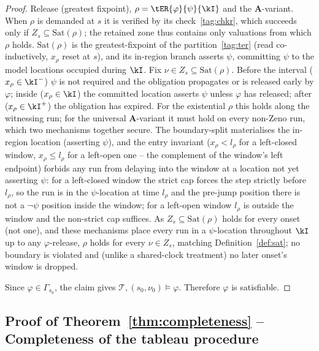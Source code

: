 \begin{proof}
{Release (greatest fixpoint), $\rho=\tER{\varphi}{\psi}{\kI}$ and the $\mathbf{A}$-variant.} When $\rho$ is demanded at $s$ it is verified by its check~\eqref{tag:chkr}, which succeeds only if $Z_s\subseteq\mathrm{Sat}(\rho)$; the retained zone thus contains only valuations from which $\rho$ holds. $\mathrm{Sat}(\rho)$ is the greatest-fixpoint of the partition~\eqref{tag:ter} (read co-inductively, $x_\rho$ reset at $s$), and its in-region branch {asserts} $\psi$, committing $\psi$ to the model locations occupied during $\kI$. Fix $\nu\in Z_s\subseteq\mathrm{Sat}(\rho)$. Before the interval ($x_\rho\in\kI^{-}$) $\psi$ is not required and the obligation propagates or is released early by $\varphi$; inside ($x_\rho\in\kI$) the committed location asserts $\psi$ unless $\varphi$ has released; after ($x_\rho\in\kI^{+}$) the obligation has expired. For the {existential} $\rho$ this holds along the witnessing run; for the {universal} $\mathbf{A}$-variant it must hold on {every} non-Zeno run, which two mechanisms together secure. The boundary-split materialises the in-region location (asserting $\psi$), and the entry invariant ($x_\rho<l_\rho$ for a left-closed window, $x_\rho\le l_\rho$ for a left-open one -- the complement of the window's left endpoint) forbids any run from delaying into the window at a location not yet asserting $\psi$: for a left-closed window the strict cap forces the step {strictly before} $l_\rho$, so the run is in the $\psi$-location {at} time $l_\rho$ and the pre-jump position there is not a $\neg\psi$ position inside the window; for a left-open window $l_\rho$ is outside the window and the non-strict cap suffices. As $Z_s\subseteq\mathrm{Sat}(\rho)$ holds for {every} onset (not one), and these mechanisms place every run in a $\psi$-location throughout $\kI$ up to any $\varphi$-release, $\rho$ holds for every $\nu\in Z_s$, matching Definition~\ref{def:sat}; no boundary is violated and (unlike a shared-clock treatment) no later onset's window is dropped.

Since $\varphi\in\Gamma_{s_0}$, the claim gives $\mathcal{T},(s_0,\nu_0)\models\varphi$. Therefore $\varphi$ is satisfiable.
\end{proof}




\subsection{Proof of Theorem~\ref{thm:completeness} -- Completeness of the tableau procedure}


